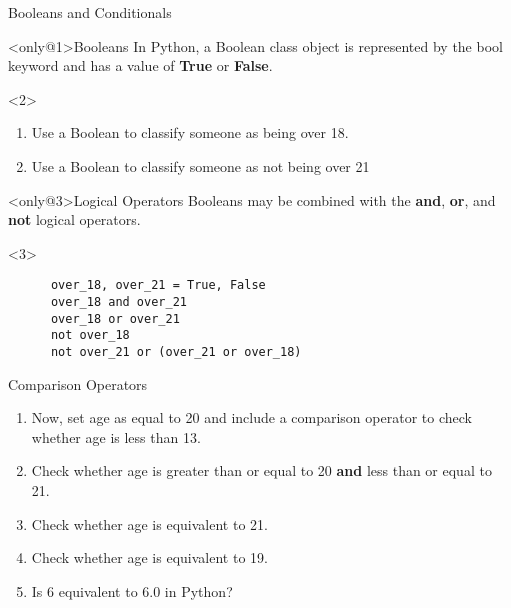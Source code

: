 \documentclass[../main.tex]{subfiles}
\begin{document}
\begin{frame}[fragile]{Booleans and Conditionals}

  \begin{block}<only@1>{Booleans} \justifying
In Python, a Boolean class object is represented by the bool keyword and has a value of \textbf{True} or \textbf{False}.
\end{block}

\begin{onlyenv}<2>
  \begin{exercise}{}
  \begin{enumerate}
  \item Use a Boolean to classify someone as being over 18.
  \item Use a Boolean to classify someone as not being over 21 
  \end{enumerate}
\end{exercise}
\end{onlyenv}


  \begin{block}<only@3>{Logical Operators}
    Booleans may be combined with the \textbf{and}, \textbf{or}, and \textbf{not} logical operators.
  \end{block}


  \begin{onlyenv}<3>
    \begin{code}{}
    \begin{lstlisting}
      over_18, over_21 = True, False
      over_18 and over_21
      over_18 or over_21
      not over_18
      not over_21 or (over_21 or over_18)
    \end{lstlisting}
  \end{code}
  \end{onlyenv}
\end{frame}

\begin{frame}[fragile]{Comparison Operators}
  \begin{exercise}{}
    \begin{enumerate} \justifying
    \item Now, set age as equal to 20 and include a comparison operator to check whether age is less than 13.
    \item Check whether age is greater than or equal to 20 \textbf{and} less than or equal to 21.
    \item Check whether age is equivalent to 21.
    \item Check whether age is equivalent to 19.
    \item Is 6 equivalent to 6.0 in Python? 
    \end{enumerate}
  \end{exercise}
\end{frame}
\end{document}
